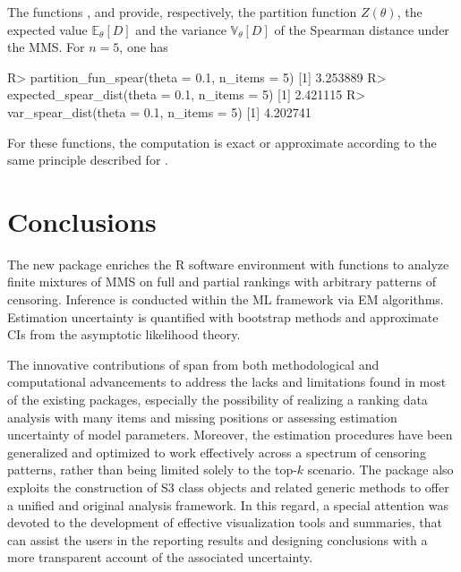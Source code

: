 The functions ,   and  provide, respectively, the partition function $Z(\theta)$, the expected value $\mathbb{E}_{\theta}[D]$ and the variance $\mathbb{V}_{\theta}[D]$ of the Spearman distance under the MMS. For $n=5$, one has
\begin{example}
R> partition_fun_spear(theta = 0.1, n_items = 5)
[1] 3.253889
R> expected_spear_dist(theta = 0.1, n_items = 5)
[1] 2.421115
R> var_spear_dist(theta = 0.1, n_items = 5)
[1] 4.202741
\end{example}
For these functions, the computation is exact or approximate according to the same principle described for .


\section{Conclusions}
\label{sec:concl}
The new  package enriches the \textsf{R} software environment with functions to analyze finite mixtures of MMS on full and partial rankings with arbitrary patterns of censoring. Inference is conducted within the ML framework via EM algorithms. Estimation uncertainty is quantified with bootstrap methods and approximate CIs from the asymptotic likelihood theory.

The innovative contributions of  span from both methodological and computational advancements to address the lacks and limitations found in most of the existing packages, especially the possibility of realizing a ranking data analysis with many items and missing positions or assessing estimation uncertainty of model parameters. Moreover, the estimation procedures have been generalized and optimized to work effectively across a spectrum of censoring patterns, rather than being limited solely to the top-$k$ scenario.
The package also exploits the construction of S3 class objects and related generic methods to offer a unified and original analysis framework. In this regard, a special attention was devoted to the development of effective visualization tools and summaries, that can assist the users in the reporting results and designing conclusions with a more transparent account of the associated uncertainty.

